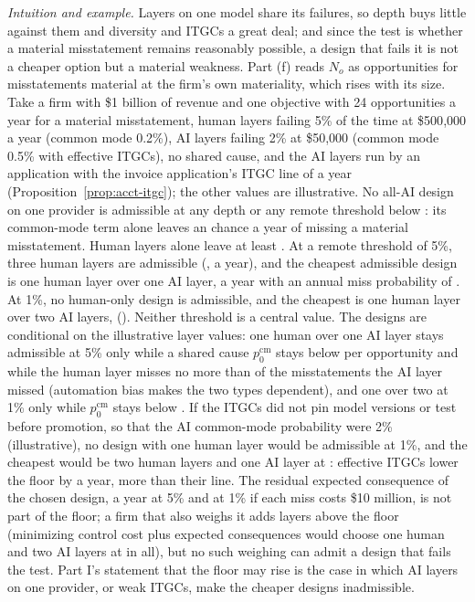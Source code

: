 \noindent\emph{Intuition and example.} Layers on one model share its failures, so depth buys little against them and diversity and ITGCs a great deal; and since the test is whether a material misstatement remains reasonably possible, a design that fails it is not a cheaper option but a material weakness. Part (f) reads $N_o$ as opportunities for misstatements material at the firm's own materiality, which rises with its size. Take a firm with \$1 billion of revenue and one objective with 24 opportunities a year for a material misstatement, human layers failing 5\% of the time at \$500{,}000 a year (common mode 0.2\%), AI layers failing 2\% at \$50{,}000 (common mode 0.5\% with effective ITGCs), no shared cause, and the AI layers run by an application with the invoice application's ITGC line of \acctAminLine{} a year (Proposition~\ref{prop:acct-itgc}); the other values are illustrative. No all-AI design on one provider is admissible at any depth or any remote threshold below \acctAminFloorAI: its common-mode term alone leaves an \acctAminFloorAI{} chance a year of missing a material misstatement. Human layers alone leave at least \acctAminFloorHu. At a remote threshold of 5\%, three human layers are admissible (\acctAminHumThreeMiss, \acctAminHumThreeCost{} a year), and the cheapest admissible design is one human layer over one AI layer, \acctAminFiveCost{} a year with an annual miss probability of \acctAminFiveMiss. At 1\%, no human-only design is admissible, and the cheapest is one human layer over two AI layers, \acctAminOneCost{} (\acctAminOneMiss). Neither threshold is a central value. The designs are conditional on the illustrative layer values: one human over one AI layer stays admissible at 5\% only while a shared cause $p^{\mathrm{cm}}_0$ stays below \acctAminPccFive{} per opportunity and while the human layer misses no more than \acctAminPhmFive{} of the misstatements the AI layer missed (automation bias \citep{parasuraman2010complacency} makes the two types dependent), and one over two at 1\% only while $p^{\mathrm{cm}}_0$ stays below \acctAminPccOne. If the ITGCs did not pin model versions or test before promotion, so that the AI common-mode probability were 2\% (illustrative), no design with one human layer would be admissible at 1\%, and the cheapest would be two human layers and one AI layer at \acctAminWeakOneCost: effective ITGCs lower the floor by \acctAminItgcValue{} a year, more than their line. The residual expected consequence of the chosen design, \acctAminFiveResid{} a year at 5\% and \acctAminOneResid{} at 1\% if each miss costs \$10 million, is not part of the floor; a firm that also weighs it adds layers above the floor (minimizing control cost plus expected consequences would choose one human and two AI layers at \acctAminLossCost{} in all), but no such weighing can admit a design that fails the test. Part I's statement that the floor may rise is the case in which AI layers on one provider, or weak ITGCs, make the cheaper designs inadmissible.

